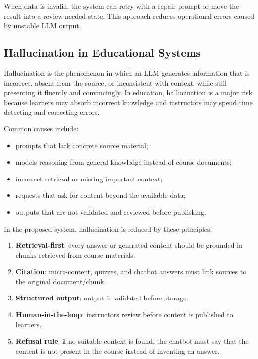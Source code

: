 When data is invalid, the system can retry with a repair prompt or move
the result into a review-needed state. This approach reduces operational
errors caused by unstable LLM output.

\subsection{Hallucination in Educational Systems}
\label{subsec:hallucination-giao-duc}

Hallucination is the phenomenon in which an LLM generates information
that is incorrect, absent from the source, or inconsistent with context,
while still presenting it fluently and convincingly. In education,
hallucination is a major risk because learners may absorb incorrect
knowledge and instructors may spend time detecting and correcting errors.

Common causes include:

\begin{itemize}
    \item prompts that lack concrete source material;
    \item models reasoning from general knowledge instead of course documents;
    \item incorrect retrieval or missing important context;
    \item requests that ask for content beyond the available data;
    \item outputs that are not validated and reviewed before publishing.
\end{itemize}

In the proposed system, hallucination is reduced by these principles:

\begin{enumerate}
    \item \textbf{Retrieval-first}: every answer or generated content
          should be grounded in chunks retrieved from course materials.
    \item \textbf{Citation}: micro-content, quizzes, and chatbot answers
          must link sources to the original document/chunk.
    \item \textbf{Structured output}: output is validated before storage.
    \item \textbf{Human-in-the-loop}: instructors review before content is
          published to learners.
    \item \textbf{Refusal rule}: if no suitable context is found, the
          chatbot must say that the content is not present in the course
          instead of inventing an answer.
\end{enumerate}


